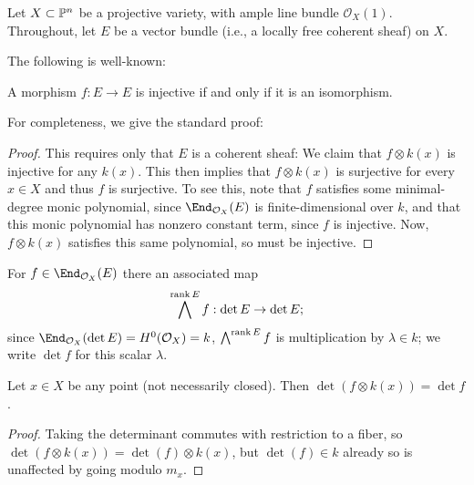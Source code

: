 \documentclass[12pt]{article}
\let\l\lambda
\def\O{\mathcal O}
\numberwithin{equation}{section}
\theoremstyle{theorem}
\numberwithin{thm}{section}
\theoremstyle{definition}
\begin{document}
Let $X\subset \P^n$ be a projective variety, with ample line bundle $\O_X(1)$.
Throughout, let $E$ be a vector bundle (i.e., a locally free coherent sheaf) on $X$.

The following is well-known:

\begin{lem}
A morphism $f:E\to E$ is injective if and only if it is an isomorphism.
\end{lem}


For completeness, we give the standard proof:

\begin{proof}
This requires only that $E$ is a coherent sheaf:
We claim that $f\otimes k(x)$ is injective for any $k(x)$. This then implies that $f\otimes k(x)$ is surjective for every $x\in X$ and thus $f$ is surjective.
To see this, note that $f$ satisfies some minimal-degree monic polynomial, since $\End_{\O_X}(E)$ is finite-dimensional over $k$, and that this monic polynomial has nonzero constant term, since $f$ is injective. Now, $f\otimes k(x)$ satisfies this same polynomial, so must be injective.
\end{proof}

\begin{dfn}
For $f\in \End_{\O_X}(E)$ there an associated map
$$ \bigwedge^{\rank E} f: \det E\to \det E; $$
since $\End_{\O_X}(\det E) = H^0(\O_X)=k$, $\bigwedge^{\rank E} f$ is multiplication by $\l\in k$; we write $\det f$ for this scalar $\l$.
\end{dfn}

\begin{lem}
Let $x \in X$ be any point (not necessarily closed). Then $\det(f\otimes k(x)) =\det f$.
\end{lem}

\begin{proof}
Taking the determinant commutes with restriction to a fiber, so $\det(f\otimes k(x)) =\det(f)\otimes k(x)$, but $\det(f)\in k$ already so is unaffected by going modulo $m_x$.
\end{proof}
\end{document}
